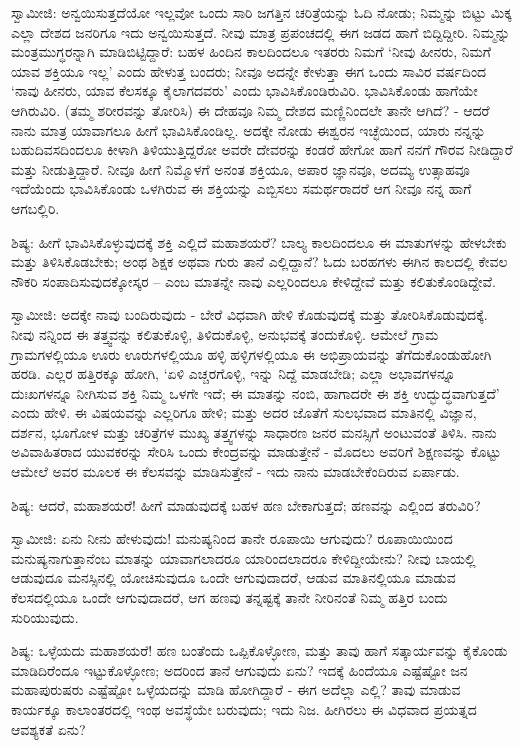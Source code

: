 ಸ್ವಾಮೀಜಿ: ಅನ್ವಯಿಸುತ್ತದೆಯೋ ಇಲ್ಲವೋ ಒಂದು ಸಾರಿ ಜಗತ್ತಿನ ಚರಿತ್ರೆಯನ್ನು ಓದಿ ನೋಡು; ನಿಮ್ಮನ್ನು ಬಿಟ್ಟು ಮಿಕ್ಕ ಎಲ್ಲಾ ದೇಶದ ಜನರಿಗೂ ಇದು ಅನ್ವಯಿಸುತ್ತದೆ. ನೀವು ಮಾತ್ರ ಪ್ರಪಂಚದಲ್ಲಿ ಈಗ ಜಡದ ಹಾಗೆ ಬಿದ್ದಿದ್ದೀರಿ. ನಿಮ್ಮನ್ನು ಮಂತ್ರಮುಗ್ಧರನ್ನಾಗಿ ಮಾಡಿಬಿಟ್ಟಿದ್ದಾರೆ: ಬಹಳ ಹಿಂದಿನ ಕಾಲದಿಂದಲೂ ಇತರರು ನಿಮಗೆ ‘ನೀವು ಹೀನರು, ನಿಮಗೆ ಯಾವ ಶಕ್ತಿಯೂ ಇಲ್ಲ’ ಎಂದು ಹೇಳುತ್ತ ಬಂದರು; ನೀವೂ ಅದನ್ನೇ ಕೇಳುತ್ತಾ ಈಗ ಒಂದು ಸಾವಿರ ವರ್ಷದಿಂದ ‘ನಾವು ಹೀನರು, ಯಾವ ಕೆಲಸಕ್ಕೂ ಕೈಲಾಗದವರು’ ಎಂದು ಭಾವಿಸಿಕೊಂಡಿರುವಿರಿ. ಭಾವಿಸಿಕೊಂಡು ಹಾಗೆಯೇ ಆಗಿರುವಿರಿ. (ತಮ್ಮ ಶರೀರವನ್ನು ತೋರಿಸಿ) ಈ ದೇಹವೂ ನಿಮ್ಮ ದೇಶದ ಮಣ್ಣಿನಿಂದಲೇ ತಾನೇ ಆಗಿದೆ? - ಆದರೆ ನಾನು ಮಾತ್ರ ಯಾವಾಗಲೂ ಹೀಗೆ ಭಾವಿಸಿಕೊಂಡಿಲ್ಲ. ಅದಕ್ಕೇ ನೋಡು ಈಶ್ವರನ ಇಚ್ಛೆಯಿಂದ, ಯಾರು ನನ್ನನ್ನು ಬಹುದಿವಸದಿಂದಲೂ ಕೀಳಾಗಿ ತಿಳಿಯುತ್ತಿದ್ದರೋ ಅವರೇ ದೇವರನ್ನು ಕಂಡರೆ ಹೇಗೋ ಹಾಗೆ ನನಗೆ ಗೌರವ ನೀಡಿದ್ದಾರೆ ಮತ್ತು ನೀಡುತ್ತಿದ್ದಾರೆ. ನೀವೂ ಹೀಗೆ ನಿಮ್ಮೊಳಗೆ ಅನಂತ ಶಕ್ತಿಯೂ, ಅಪಾರ ಜ್ಞಾನವೂ, ಅದಮ್ಯ ಉತ್ಸಾಹವೂ ಇದೆಯೆಂದು ಭಾವಿಸಿಕೊಂಡು ಒಳಗಿರುವ ಈ ಶಕ್ತಿಯನ್ನು ಎಬ್ಬಿಸಲು ಸಮರ್ಥರಾದರೆ ಆಗ ನೀವೂ ನನ್ನ ಹಾಗೆ ಆಗಬಲ್ಲಿರಿ.

ಶಿಷ್ಯ: ಹೀಗೆ ಭಾವಿಸಿಕೊಳ್ಳುವುದಕ್ಕೆ ಶಕ್ತಿ ಎಲ್ಲಿದೆ ಮಹಾಶಯರೆ? ಬಾಲ್ಯ ಕಾಲದಿಂದಲೂ ಈ ಮಾತುಗಳನ್ನು ಹೇಳಬೇಕು ಮತ್ತು ತಿಳಿಸಿಕೊಡಬೇಕು; ಅಂಥ ಶಿಕ್ಷಕ ಅಥವಾ ಗುರು ತಾನೆ ಎಲ್ಲಿದ್ದಾನೆ? ಓದು ಬರಹಗಳು ಈಗಿನ ಕಾಲದಲ್ಲಿ ಕೇವಲ ನೌಕರಿ ಸಂಪಾದಿಸುವುದಕ್ಕೋಸ್ಕರ – ಎಂಬ ಮಾತನ್ನೇ ನಾವು ಎಲ್ಲರಿಂದಲೂ ಕೇಳಿದ್ದೇವೆ ಮತ್ತು ಕಲಿತುಕೊಂಡಿದ್ದೇವೆ.

ಸ್ವಾಮೀಜಿ: ಅದಕ್ಕೇ ನಾವು ಬಂದಿರುವುದು - ಬೇರೆ ವಿಧವಾಗಿ ಹೇಳಿ ಕೊಡುವುದಕ್ಕೆ ಮತ್ತು ತೋರಿಸಿಕೊಡುವುದಕ್ಕೆ. ನೀವು ನನ್ನಿಂದ ಈ ತತ್ತ್ವವನ್ನು ಕಲಿತುಕೊಳ್ಳಿ, ತಿಳಿದುಕೊಳ್ಳಿ, ಅನುಭವಕ್ಕೆ ತಂದುಕೊಳ್ಳಿ. ಆಮೇಲೆ ಗ್ರಾಮ ಗ್ರಾಮಗಳಲ್ಲಿಯೂ ಊರು ಊರುಗಳಲ್ಲಿಯೂ ಹಳ್ಳಿ ಹಳ್ಳಿಗಳಲ್ಲಿಯೂ ಈ ಅಭಿಪ್ರಾಯವನ್ನು ತೆಗೆದುಕೊಂಡುಹೋಗಿ ಹರಡಿ. ಎಲ್ಲರ ಹತ್ತಿರಕ್ಕೂ ಹೋಗಿ, ‘ಏಳಿ ಎಚ್ಚರಗೊಳ್ಳಿ, ಇನ್ನು ನಿದ್ದೆ ಮಾಡಬೇಡಿ; ಎಲ್ಲಾ ಅಭಾವಗಳನ್ನೂ ದುಃಖಗಳನ್ನೂ ನೀಗಿಸುವ ಶಕ್ತಿ ನಿಮ್ಮ ಒಳಗೇ ಇದೆ; ಈ ಮಾತನ್ನು ನಂಬಿ, ಹಾಗಾದರೇ ಈ ಶಕ್ತಿ ಉದ್ಭುದ್ಧವಾಗುತ್ತದೆ’ ಎಂದು ಹೇಳಿ. ಈ ವಿಷಯವನ್ನು ಎಲ್ಲರಿಗೂ ಹೇಳಿ; ಮತ್ತು ಅದರ ಜೊತೆಗೆ ಸುಲಭವಾದ ಮಾತಿನಲ್ಲಿ ವಿಜ್ಞಾನ, ದರ್ಶನ, ಭೂಗೋಳ ಮತ್ತು ಚರಿತ್ರೆಗಳ ಮುಖ್ಯ ತತ್ತ್ವಗಳನ್ನು ಸಾಧಾರಣ ಜನರ ಮನಸ್ಸಿಗೆ ಅಂಟುವಂತೆ ತಿಳಿಸಿ. ನಾನು ಅವಿವಾಹಿತರಾದ ಯುವಕರನ್ನು ಸೇರಿಸಿ ಒಂದು ಕೇಂದ್ರವನ್ನು ಮಾಡುತ್ತೇನೆ - ಮೊದಲು ಅವರಿಗೆ ಶಿಕ್ಷಣವನ್ನು ಕೊಟ್ಟು ಆಮೇಲೆ ಅವರ ಮೂಲಕ ಈ ಕೆಲಸವನ್ನು ಮಾಡಿಸುತ್ತೇನೆ - ಇದು ನಾನು ಮಾಡಬೇಕೆಂದಿರುವ ಏರ್ಪಾಡು.

ಶಿಷ್ಯ: ಆದರೆ, ಮಹಾಶಯರೆ! ಹೀಗೆ ಮಾಡುವುದಕ್ಕೆ ಬಹಳ ಹಣ ಬೇಕಾಗುತ್ತದೆ; ಹಣವನ್ನು ಎಲ್ಲಿಂದ ತರುವಿರಿ?

ಸ್ವಾಮೀಜಿ: ಏನು ನೀನು ಹೇಳುವುದು! ಮನುಷ್ಯನಿಂದ ತಾನೇ ರೂಪಾಯಿ ಆಗುವುದು? ರೂಪಾಯಿಯಿಂದ ಮನುಷ್ಯನಾಗುತ್ತಾನೆಂಬ ಮಾತನ್ನು ಯಾವಾಗಲಾದರೂ ಯಾರಿಂದಲಾದರೂ ಕೇಳಿದ್ದೀಯೇನು? ನೀವು ಬಾಯಲ್ಲಿ ಆಡುವುದೂ ಮನಸ್ಸಿನಲ್ಲಿ ಯೋಚಿಸುವುದೂ ಒಂದೇ ಆಗುವುದಾದರೆ, ಆಡುವ ಮಾತಿನಲ್ಲಿಯೂ ಮಾಡುವ ಕೆಲಸದಲ್ಲಿಯೂ ಒಂದೇ ಆಗುವುದಾದರೆ, ಆಗ ಹಣವು ತನ್ನಷ್ಟಕ್ಕೆ ತಾನೇ ನೀರಿನಂತೆ ನಿಮ್ಮ ಹತ್ತಿರ ಬಂದು ಸುರಿಯುವುದು.

ಶಿಷ್ಯ: ಒಳ್ಳೆಯದು ಮಹಾಶಯರೆ! ಹಣ ಬಂತೆಂದು ಒಪ್ಪಿಕೊಳ್ಳೋಣ, ಮತ್ತು ತಾವು ಹಾಗೆ ಸತ್ಕಾರ್ಯವನ್ನು ಕೈಕೊಂಡು ಮಾಡಿದಿರೆಂದೂ ಇಟ್ಟುಕೊಳ್ಳೋಣ; ಅದರಿಂದ ತಾನೆ ಆಗುವುದು ಏನು? ಇದಕ್ಕೆ ಹಿಂದೆಯೂ ಎಷ್ಟೆಷ್ಟೋ ಜನ ಮಹಾಪುರುಷರು ಎಷ್ಟೆಷ್ಟೋ ಒಳ್ಳೆಯದನ್ನು ಮಾಡಿ ಹೋಗಿದ್ದಾರೆ - ಈಗ ಅದೆಲ್ಲಾ ಎಲ್ಲಿ? ತಾವು ಮಾಡುವ ಕಾರ್ಯಕ್ಕೂ ಕಾಲಾಂತರದಲ್ಲಿ ಇಂಥ ಅವಸ್ಥೆಯೇ ಬರುವುದು; ಇದು ನಿಜ. ಹೀಗಿರಲು ಈ ವಿಧವಾದ ಪ್ರಯತ್ನದ ಆವಶ್ಯಕತೆ ಏನು?


